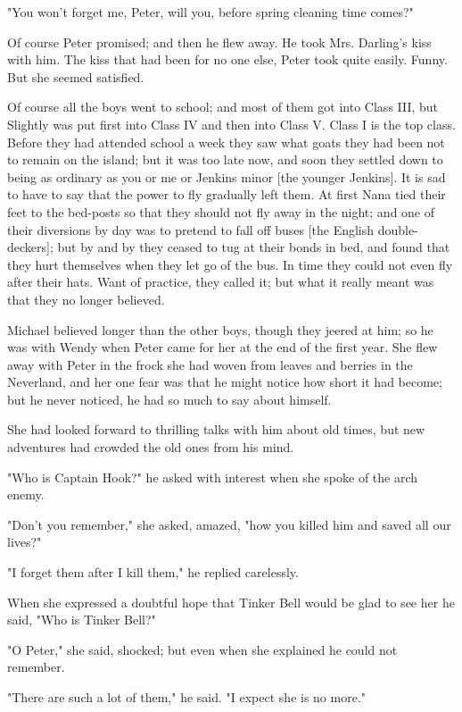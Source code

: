 "You won't forget me, Peter, will you, before spring cleaning time comes?"


Of course Peter promised; and then he flew away. He took Mrs. Darling's
kiss with him. The kiss that had been for no one else, Peter took quite
easily. Funny. But she seemed satisfied.


Of course all the boys went to school; and most of them got into Class
III, but Slightly was put first into Class IV and then into Class V. Class
I is the top class. Before they had attended school a week they saw what
goats they had been not to remain on the island; but it was too late now,
and soon they settled down to being as ordinary as you or me or Jenkins
minor [the younger Jenkins]. It is sad to have to say that the power to
fly gradually left them. At first Nana tied their feet to the bed-posts so
that they should not fly away in the night; and one of their diversions by
day was to pretend to fall off buses [the English double-deckers]; but by
and by they ceased to tug at their bonds in bed, and found that they hurt
themselves when they let go of the bus. In time they could not even fly
after their hats. Want of practice, they called it; but what it really
meant was that they no longer believed.


Michael believed longer than the other boys, though they jeered at him; so
he was with Wendy when Peter came for her at the end of the first year.
She flew away with Peter in the frock she had woven from leaves and
berries in the Neverland, and her one fear was that he might notice how
short it had become; but he never noticed, he had so much to say about
himself.


She had looked forward to thrilling talks with him about old times, but
new adventures had crowded the old ones from his mind.


"Who is Captain Hook?" he asked with interest when she spoke of the arch
enemy.


"Don't you remember," she asked, amazed, "how you killed him and saved all
our lives?"


"I forget them after I kill them," he replied carelessly.


When she expressed a doubtful hope that Tinker Bell would be glad to see
her he said, "Who is Tinker Bell?"


"O Peter," she said, shocked; but even when she explained he could not
remember.


"There are such a lot of them," he said. "I expect she is no more."


